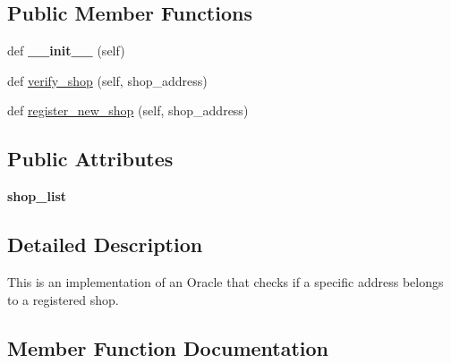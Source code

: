 \subsection*{Public Member Functions}
\begin{DoxyCompactItemize}
\item 
\mbox{\label{class_shop_list_oracle_1_1_shop_list_oracle_acf67255437b928eb038f08067297602f}} 
def {\bfseries \+\_\+\+\_\+init\+\_\+\+\_\+} (self)
\item 
def \mbox{\hyperlink{class_shop_list_oracle_1_1_shop_list_oracle_a82a22c3a5075c86d96e6e2338840309c}{verify\+\_\+shop}} (self, shop\+\_\+address)
\item 
def \mbox{\hyperlink{class_shop_list_oracle_1_1_shop_list_oracle_a8c1008ee26d4b32dbe8434f08cd5d667}{register\+\_\+new\+\_\+shop}} (self, shop\+\_\+address)
\end{DoxyCompactItemize}
\subsection*{Public Attributes}
\begin{DoxyCompactItemize}
\item 
\mbox{\label{class_shop_list_oracle_1_1_shop_list_oracle_a27e95df0f44a65951dd7b8d50deb4654}} 
{\bfseries shop\+\_\+list}
\end{DoxyCompactItemize}


\subsection{Detailed Description}
\begin{DoxyVerb}This is an implementation of an Oracle that checks if a specific address belongs
to a registered shop.
\end{DoxyVerb}
 

\subsection{Member Function Documentation}
\mbox{\label{class_shop_list_oracle_1_1_shop_list_oracle_a8c1008ee26d4b32dbe8434f08cd5d667}} 
